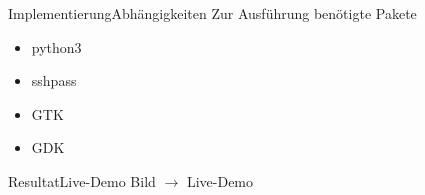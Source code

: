 \documentclass[ngerman,10pt,xcolor=colortbl,compress
]{beamer}
\begin{document}
	\begin{frame}{Implementierung}{Abhängigkeiten}
		Zur Ausführung benötigte Pakete
		\begin{itemize}
			\item python3
			\item sshpass
			\item GTK
			\item GDK
		\end{itemize}
	\end{frame}
	
	\begin{frame}{Resultat}{Live-Demo}
	Bild $\rightarrow$ Live-Demo
	\end{frame}

	
\end{document}
